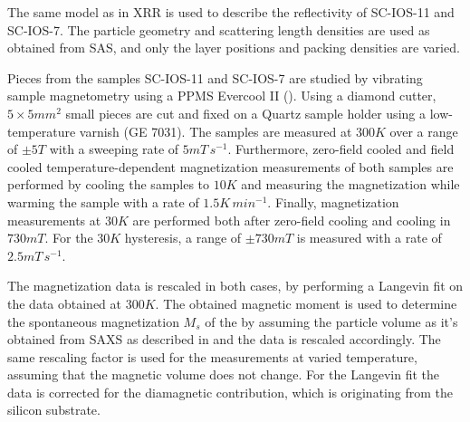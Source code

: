 \documentclass[\main/dresen_thesis.tex]{subfiles}
\begin{document}
    The same model as in XRR is used to describe the reflectivity of SC-IOS-11 and SC-IOS-7.
    The particle geometry and scattering length densities are used as obtained from SAS, and only the layer positions and packing densities are varied.

    Pieces from the samples SC-IOS-11 and SC-IOS-7 are studied by vibrating sample magnetometry using a PPMS Evercool II ().
    Using a diamond cutter, $5 \times 5 \unit{mm^2}$ small pieces are cut and fixed on a Quartz sample holder using a low-temperature varnish (GE 7031).
    The samples are measured at $300 \unit{K}$ over a range of $\pm 5 \unit{T}$ with a sweeping rate of $5 \unit{mT \, s^{-1}}$.
    Furthermore, zero-field cooled and field cooled temperature-dependent magnetization measurements of both samples are performed by cooling the samples to $10 \unit{K}$ and measuring the magnetization while warming the sample with a rate of $1.5 \unit{K \, min^{-1}}$.
    Finally, magnetization measurements at $30 \unit{K}$ are performed both after zero-field cooling and cooling in $730 \unit{mT}$.
    For the $30 \unit{K}$ hysteresis, a range of $\pm 730 \unit{mT}$ is measured with a rate of $2.5 \unit{mT \, s^{-1}}$.

    The magnetization data is rescaled in both cases, by performing a Langevin fit on the data obtained at $300 \unit{K}$.
    The obtained magnetic moment is used to determine the spontaneous magnetization $M_s$ of the by assuming the particle volume as it's obtained from SAXS as described in  and the data is rescaled accordingly.
    The same rescaling factor is used for the measurements at varied temperature, assuming that the magnetic volume does not change.
    For the Langevin fit the data is corrected for the diamagnetic contribution, which is originating from the silicon substrate.
\end{document}
